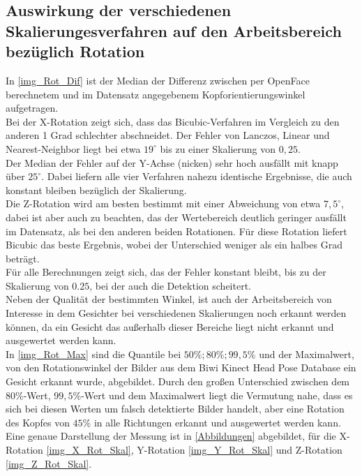 \subsection{Auswirkung der verschiedenen Skalierungesverfahren auf den Arbeitsbereich bezüglich Rotation}
In \autoref{img_Rot_Dif} ist der Median der Differenz zwischen per OpenFace berechnetem und im Datensatz angegebenem Kopforientierungswinkel aufgetragen.\\
Bei der X-Rotation zeigt sich, dass das Bicubic-Verfahren im Vergleich zu den anderen 1 Grad schlechter abschneidet. Der Fehler von Lanczos, Linear und Nearest-Neighbor liegt bei etwa $19^\circ$ bis zu einer Skalierung von $0,25$.\\
Der Median der Fehler auf der Y-Achse (nicken) sehr hoch ausfällt mit knapp über $25^\circ$. 
Dabei liefern alle vier Verfahren nahezu identische Ergebnisse, die auch konstant bleiben bezüglich der Skalierung.\\
Die Z-Rotation wird am besten bestimmt mit einer Abweichung von etwa $7,5^\circ$, dabei ist aber auch zu beachten, das der Wertebereich deutlich geringer ausfällt im Datensatz, als bei den anderen beiden Rotationen. Für diese Rotation liefert Bicubic das beste Ergebnis, wobei der Unterschied weniger als ein halbes Grad beträgt.\\
Für alle Berechnungen zeigt sich, das der Fehler konstant bleibt, bis zu der Skalierung von $0.25$, bei der auch die Detektion scheitert.\\
Neben der Qualität der bestimmten Winkel, ist auch der Arbeitsbereich von Interesse in dem Gesichter bei verschiedenen Skalierungen noch erkannt werden können, da ein Gesicht das außerhalb dieser Bereiche liegt nicht erkannt und ausgewertet werden kann.\\
In \autoref{img_Rot_Max} sind die Quantile bei $50\%; 80\%; 99,5\%$ und der Maximalwert, von den Rotationswinkel der Bilder aus dem Biwi Kinect Head Pose Database \cite{BIWI_database} ein Gesicht erkannt wurde, abgebildet. Durch den großen Unterschied zwischen dem $80\%$-Wert, $99,5\%$-Wert und dem Maximalwert liegt die Vermutung nahe, dass es sich bei diesen Werten um falsch detektierte Bilder handelt, aber eine Rotation des Kopfes von $45\%$ in alle Richtungen erkannt und ausgewertet werden kann.\\
Eine genaue Darstellung der Messung ist in \autoref{Abbildungen} abgebildet, für die X-Rotation \autoref{img_X_Rot_Skal}, Y-Rotation \autoref{img_Y_Rot_Skal} und Z-Rotation \autoref{img_Z_Rot_Skal}.
